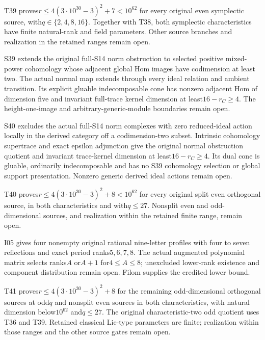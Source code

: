 T39 proves$r\le4(3\cdot10^{30}-3)^2+7<10^{62}$ for every original even symplectic source, with$q\in\{2,4,8,16\}$. Together with T38, both symplectic characteristics have finite natural-rank and field parameters. Other source branches and realization in the retained ranges remain open.


S39 extends the original full-S14 norm obstruction to selected positive mixed-power cohomology whose adjacent global Hom images have codimension at least two. The actual normal map extends through every ideal relation and ambient transition. Its explicit gluable indecomposable cone has nonzero adjacent Hom of dimension five and invariant full-trace kernel dimension at least$16-r_C\ge4$. The height-one-image and arbitrary-generic-module boundaries remain open.


S40 excludes the actual full-S14 norm complexes with zero reduced-ideal action locally in the derived category off a codimension-two subset. Intrinsic cohomology supertrace and exact epsilon adjunction give the original normal obstruction quotient and invariant trace-kernel dimension at least$16-r_C\ge4$. Its dual cone is gluable, ordinarily indecomposable and has no S39 cohomology selection or global support presentation. Nonzero generic derived ideal actions remain open.


T40 proves$r\le4(3\cdot10^{30}-3)^2+8<10^{62}$ for every original split even orthogonal source, in both characteristics and with$q\le27$. Nonsplit even and odd-dimensional sources, and realization within the retained finite range, remain open.


I05 gives four nonempty original rational nine-letter profiles with four to seven reflections and exact period ranks$5,6,7,8$. The actual augmented polynomial matrix selects ranks$A$ or$A+1$ for$4\le A\le8$; unexcluded lower-rank existence and component distribution remain open. Filom supplies the credited lower bound.


T41 proves$r\le4(3\cdot10^{30}-3)^2+8$ for the remaining odd-dimensional orthogonal sources at odd$q$ and nonsplit even sources in both characteristics, with natural dimension below$10^{62}$ and$q\le27$. The original characteristic-two odd quotient uses T36 and T39. Retained classical Lie-type parameters are finite; realization within those ranges and the other source gates remain open.
